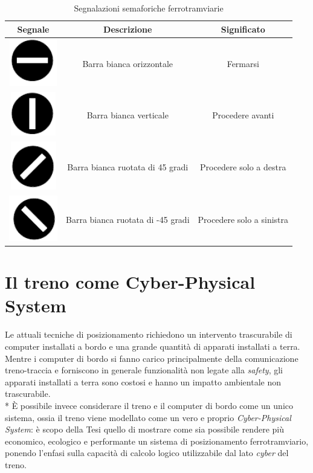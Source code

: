 \begin{table}
\begin{tabular}{|c|c|c|}
	\hline 
	\textbf{Segnale} & \textbf{Descrizione} & \textbf{Significato} \\

	\hline
	\includegraphics{img/stopsemaphore}& Barra bianca orizzontale & Fermarsi \\ 
	\hline 
	\includegraphics{img/gosemaphore}& Barra bianca verticale  & Procedere avanti \\ 
	\hline 
	\includegraphics{img/rightsemaphore}& Barra bianca ruotata di 45 gradi & Procedere solo a destra \\ 
	\hline 
	\includegraphics{img/leftsemaphore}& Barra bianca ruotata di -45 gradi & Procedere solo a sinistra \\ 
	\hline 
\end{tabular} 
\caption{Segnalazioni semaforiche ferrotramviarie}
\label{tab:sem}
\end{table}
\section{Il treno come Cyber-Physical System}
Le attuali tecniche di posizionamento richiedono un intervento trascurabile di computer installati a bordo e una grande quantit\`a di apparati installati a terra. Mentre i computer di bordo si fanno carico principalmente della comunicazione treno-traccia e forniscono in generale funzionalit\`a non legate alla \emph{safety}, gli apparati installati a terra sono costosi e hanno un impatto ambientale non trascurabile.\\*
\`E possibile invece considerare il treno e il computer di bordo come un unico sistema, ossia il treno viene modellato come un vero e proprio \emph{Cyber-Physical System}: \`e scopo della Tesi quello di mostrare come sia possibile rendere pi\`u economico, ecologico e performante un sistema di posizionamento ferrotramviario, ponendo l'enfasi sulla capacit\`a di calcolo logico utilizzabile dal lato \emph{cyber} del treno.